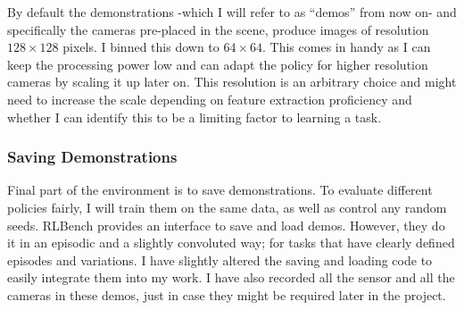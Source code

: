 By default the demonstrations -which I will refer to as ``demos'' from now on- and specifically the cameras pre-placed in the scene, produce images of resolution $128 \times 128$ pixels. I binned this down to $64 \times 64$. This comes in handy as I can keep the processing power low and can adapt the policy for higher resolution cameras by scaling it up later on. This resolution is an arbitrary choice and might need to increase the scale depending on feature extraction proficiency and whether I can identify this to be a limiting factor to learning a task.

\subsubsection{Saving Demonstrations}\label{subsec:saving-demos}
Final part of the environment is to save demonstrations. To evaluate different policies fairly, I will train them on the same data, as well as control any random seeds. RLBench provides an interface to save and load demos. However, they do it in an episodic and a slightly convoluted way; for tasks that have clearly defined episodes and variations. I have slightly altered the saving and loading code to easily integrate them into my work. I have also recorded all the sensor and all the cameras in these demos, just in case they might be required later in the project.


